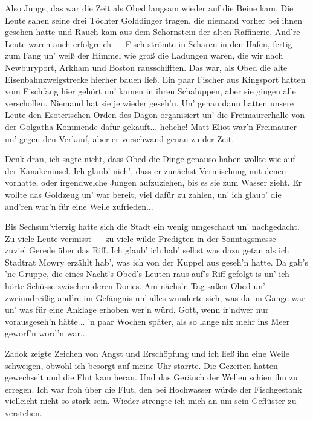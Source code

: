 Also Junge, das war die Zeit als Obed langsam wieder auf die Beine kam. Die Leute sahen seine drei Töchter Golddinger tragen, die niemand vorher bei ihnen gesehen hatte und Rauch kam aus dem Schornstein der alten Raffinerie. And're Leute waren auch erfolgreich --- Fisch strömte in Scharen in den Hafen, fertig zum Fang un' weiß der Himmel wie groß die Ladungen waren, die wir nach Newburyport, Arkham und Boston rausschifften. Das war, als Obed die alte Eisenbahnzweigstrecke hierher bauen ließ. Ein paar Fischer aus Kingsport hatten vom Fischfang hier gehört un' kamen in ihren Schaluppen, aber sie gingen alle verschollen. Niemand hat sie je wieder geseh'n. Un' genau dann hatten unsere Leute den Esoterischen Orden des Dagon organisiert un' die Freimaurerhalle von der Golgatha-Kommende dafür gekauft... hehehe! Matt Eliot war'n Freimaurer un' gegen den Verkauf, aber er verschwand genau zu der Zeit.

Denk dran, ich sagte nicht, dass Obed die Dinge genauso haben wollte wie auf der Kanakeninsel. Ich glaub' nich', dass er zunächst Vermischung mit denen vorhatte, oder irgendwelche Jungen aufzuziehen, bis es sie zum Wasser zieht. Er wollte das Goldzeug un' war bereit, viel dafür zu zahlen, un' ich glaub' die and'ren war'n für eine Weile zufrieden...

Bis Sechsun'vierzig hatte sich die Stadt ein wenig umgeschaut un' nachgedacht. Zu viele Leute vermisst --- zu viele wilde Predigten in der Sonntagsmesse --- zuviel Gerede über das Riff. Ich glaub' ich hab' selbst was dazu getan als ich Stadtrat Mowry erzählt hab', was ich von der Kuppel aus geseh'n hatte. Da gab's 'ne Gruppe, die eines Nacht's Obed's Leuten raus auf's Riff gefolgt is un' ich hörte Schüsse zwischen deren Dories. Am nächs'n Tag saßen Obed un' zweiundreißig and're im Gefängnis un' alles wunderte sich, was da im Gange war un' was für eine Anklage erhoben wer'n würd. Gott, wenn ir'ndwer nur vorausgeseh'n hätte... 'n paar Wochen später, als so lange nix mehr ins Meer geworf'n word'n war...\grqq

Zadok zeigte Zeichen von Angst und Erschöpfung und ich ließ ihn eine Weile schweigen, obwohl ich besorgt auf meine Uhr starrte. Die Gezeiten hatten gewechselt und die Flut kam heran. Und das Geräuch der Wellen schien ihn zu erregen. Ich war froh über die Flut, den bei Hochwasser würde der Fischgestank vielleicht nicht so stark sein. Wieder strengte ich mich an um sein Geflüster zu verstehen.

